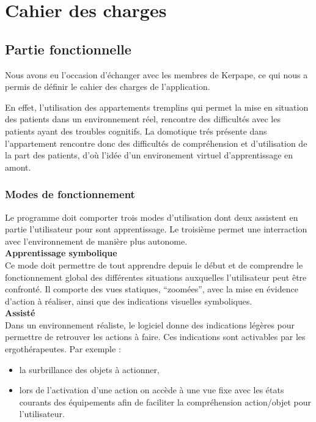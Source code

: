 \section{Cahier des charges}
\subsection{Partie fonctionnelle}

Nous avons eu l'occasion d'échanger avec les membres de Kerpape, ce qui nous a permis de définir le cahier des charges de l'application.

En effet, l'utilisation des appartements tremplins qui permet la mise en situation des patients dans un environnement réel, rencontre des difficultés avec les patients ayant des troubles cognitifs. La domotique trés présente dans l'appartement rencontre donc des difficultés de compréhension et d'utilisation de la part des patients, d'où l'idée d'un environement virtuel d'apprentissage en amont.

\subsubsection{Modes de fonctionnement}

Le programme doit comporter trois modes d'utilisation dont deux assistent en partie l'utilisateur pour sont apprentissage. Le troisième permet une interraction avec l'environnement de manière plus autonome.\\

\textbf{Apprentissage symbolique}
\\

Ce mode doit permettre de tout apprendre depuis le début et de comprendre le fonctionnement global des différentes situations auxquelles l'utilisateur peut être confronté. Il comporte des vues statiques, \enquote{zoomées}, avec la mise en évidence d'action à réaliser, ainsi que des indications visuelles symboliques.\\

\textbf{Assisté}
\\

Dans un environnement réaliste, le logiciel donne des indications légères pour permettre de retrouver les actions à faire. Ces indications sont activables par les ergothérapeutes. Par exemple :
\begin{itemize}
  \item la surbrillance des objets à actionner,
  \item lors de l'activation d'une action on accède à une vue fixe avec les états courants des équipements afin de faciliter la compréhension action/objet pour l'utilisateur. \\
\end{itemize}

